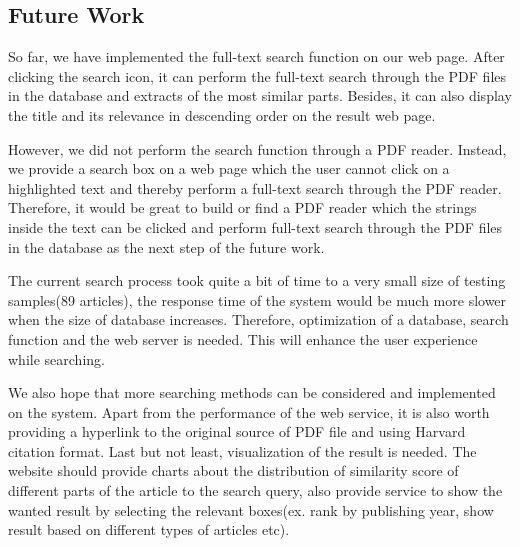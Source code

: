
\subsection{Future Work}
So far, we have implemented the full-text search function on our web page. 
After clicking the search icon, it can perform the full-text search through the PDF files in the database and extracts of the most similar parts. 
Besides, it can also display the title and its relevance in descending order on the result web page.

However, we did not perform the search function through a PDF reader.
Instead, we provide a search box on a web page which the user cannot click on a highlighted text and thereby perform a full-text search through the PDF reader. 
Therefore, it would be great to build or find a PDF reader which the strings inside the text can be clicked and perform full-text search through the PDF files in the database as the next step of the future work.
 
The current search process took quite a bit of time to a very small size of testing samples(89 articles), the response time of the system would be much more slower when the size of database increases. 
Therefore, optimization of a database, search function and the web server is needed. 
This will enhance the user experience while searching.
 
We also hope that more searching methods can be considered and implemented on the system. 
Apart from the performance of the web service, it is also worth providing a hyperlink to the original source of PDF file and using Harvard citation format.
Last but not least, visualization of the result is needed. The website should provide charts about the distribution of similarity score of different parts of the article to the search query, also provide service to show the wanted result by selecting the relevant boxes(ex. rank by publishing year, show result based on different types of articles etc).